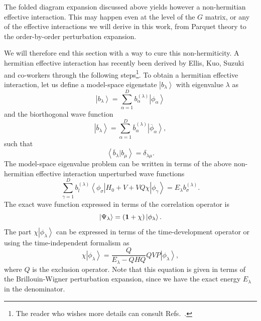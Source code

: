 The folded diagram expansion discussed above yields however
a non-hermitian effective interaction. This may happen even at the 
level of the $G$ matrix, or any of the effective interactions
we will derive in this work, from Parquet theory to
the order-by-order perturbation expansion.

We will therefore end this section with a way to cure
this non-hermiticity. 
A hermitian effective interaction has recently been derived by 
Ellis, Kuo, Suzuki and co-workers \cite{Morten:so95,Morten:so84,Morten:kehlsok93} through the
following steps\footnote{The reader who wishes more details can consult
Refs.~.}.  
To obtain a hermitian effective interaction, 
let us define 
a model-space eigenstate
$\left | b_{\lambda}\right\rangle$ with eigenvalue $\lambda$ as
\begin{equation}
     \left | b_{\lambda}\right\rangle=\sum_{\alpha =1}^{D}
     b_{\alpha}^{(\lambda )}\left | \phi_{\alpha}\right\rangle
\end{equation}
and the biorthogonal wave function
\begin{equation}
     \left | \overline{b}_{\lambda}\right\rangle=\sum_{\alpha=1}^{D}
      \overline{b}_{\alpha}^{(\lambda )}
     \left | \overline{\phi}_{\alpha}\right\rangle,
\end{equation}
such that
\begin{equation}
     {\left\langle \overline{b}_{\lambda} | b_{\mu} \right\rangle}=
     \delta_{\lambda\mu}.
\end{equation}
The model-space eigenvalue problem can be written 
in terms of the above non-hermitian effective interaction unperturbed
wave functions
\begin{equation}
     {\displaystyle
     \sum_{\gamma =1}^{D}b_l^{(\lambda )}\left\langle \phi_{\sigma}\right |
     H_0+V+VQ\chi\left | \phi_{\gamma}\right\rangle}  =
     E_{\lambda}b_{\sigma}^{(\lambda )}.
\end{equation}
The exact wave function expressed in terms of the correlation 
operator is
\begin{equation}
      \left | \Psi_{\lambda}\right\rangle=
      ({\bf 1}+\chi)\left | \phi_{\lambda}\right\rangle.
\end{equation}
The part $\chi\left | \phi_{\lambda}\right\rangle$ can be expressed in terms
of the time-development operator or 
using the time-independent formalism as
\begin{equation}
  \chi\left | \phi_{\lambda}\right\rangle=
  \frac{Q}{E_{\lambda}-QHQ}QVP\left | \phi_{\lambda}\right\rangle,
  \label{Morten:eq:newchi}
\end{equation}
where $Q$ is the exclusion operator. Note that this equation is given
in terms of the Brillouin-Wigner perturbation expansion, since
we have the exact energy $E_{\lambda}$ in the denominator.

